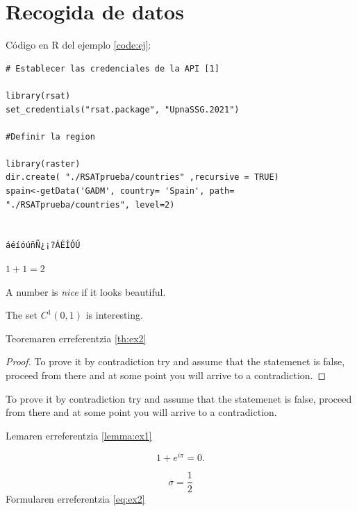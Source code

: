 \chapter[Recogida de datos]{Recogida de datos}
\label{Chap2}


Código en R del ejemplo \ref{code:ej}:
\begin{lstlisting}[style=R, caption=pie de código,label=code:ej]
# Establecer las credenciales de la API [1]

library(rsat)
set_credentials("rsat.package", "UpnaSSG.2021")

#Definir la region

library(raster)
dir.create( "./RSATprueba/countries" ,recursive = TRUE)
spain<-getData('GADM', country= 'Spain', path= "./RSATprueba/countries", level=2)


áéíóúñÑ¿¡?ÁÉÍÓÚ
\end{lstlisting}


\begin{theorem}[Sum]\label{th:ex1}
$1+1=2$
\end{theorem}

\begin{definition}\label{def:ex1}
A number is \emph{nice} if it looks beautiful.
\end{definition}

\begin{theorem}[About $C^{1}(0,1)$]\label{th:ex2}
The set $C^{1}(0,1)$ is interesting.
\end{theorem}
Teoremaren erreferentzia \ref{th:ex2}

\begin{proof}\label{pf:ex1}
To prove it by contradiction try and assume that the statemenet is false,
proceed from there and at some point you will arrive to a contradiction.
\end{proof}



\begin{lemma}\label{lemma:ex1}
To prove it by contradiction try and assume that the statemenet is false,
proceed from there and at some point you will arrive to a contradiction.
\end{lemma}

Lemaren erreferentzia \ref{lemma:ex1}


\begin{equation}\label{eq:ex2}
  1 + e^{i \pi} = 0.
\end{equation}
 
\begin{equation}\label{eq:ex3}
  \sigma = \frac{1}{2}
\end{equation}
Formularen erreferentzia \ref{eq:ex2} 